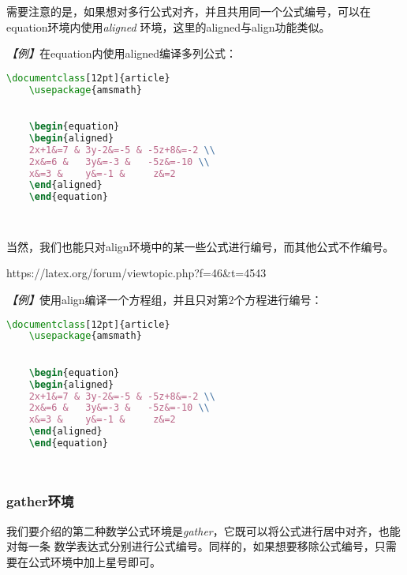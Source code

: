 需要注意的是，如果想对多行公式对齐，并且共用同一个公式编号，可以在equation环境内使用\emph{aligned}
环境，这里的aligned与align功能类似。

\emph{【例】}在equation内使用aligned编译多列公式：
\begin{lstlisting}[language=TeX]
    \documentclass[12pt]{article}
    \usepackage{amsmath}
    

    \begin{equation}
    \begin{aligned}
    2x+1&=7 & 3y-2&=-5 & -5z+8&=-2 \\
    2x&=6 &   3y&=-3 &   -5z&=-10 \\
    x&=3 &    y&=-1 &     z&=2
    \end{aligned}
    \end{equation}

    
\end{lstlisting}

当然，我们也能只对align环境中的某一些公式进行编号，而其他公式不作编号。

\begin{tcolorbox}[colback=red!5!white, colframe=red!50!black,
        title=Eqnarray: numbering last line only.]
    https://latex.org/forum/viewtopic.php?f=46\&t=4543
\end{tcolorbox}

\emph{【例】}使用align编译一个方程组，并且只对第2个方程进行编号：
\begin{lstlisting}[language=TeX]
    \documentclass[12pt]{article}
    \usepackage{amsmath}
    

    \begin{equation}
    \begin{aligned}
    2x+1&=7 & 3y-2&=-5 & -5z+8&=-2 \\
    2x&=6 &   3y&=-3 &   -5z&=-10 \\
    x&=3 &    y&=-1 &     z&=2
    \end{aligned}
    \end{equation}

    
\end{lstlisting}

\subsubsection{gather环境}
我们要介绍的第二种数学公式环境是\emph{gather}，它既可以将公式进行居中对齐，也能对每一条
数学表达式分别进行公式编号。同样的，如果想要移除公式编号，只需要在公式环境中加上星号即可。

